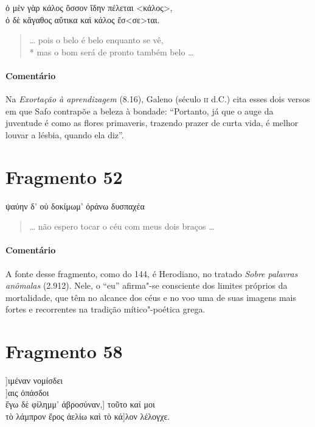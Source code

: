 \begin{gkverse}
ὀ μὲν γὰρ κάλος ὄσσον ἴδην πέλεται <κάλος>,\\
ὀ δὲ κἄγαθος αὔτικα καὶ κάλος ἔσ<σε>ται.
\end{gkverse}

\begin{verse}
\ldots{} pois o belo é belo enquanto se vê,\\*
mas o bom será de pronto também belo \ldots{}
\end{verse}

{\paragraph{Comentário} Na \textit{Exortação à aprendizagem} (8.16), Galeno (século \textsc{ii} d.C.) cita esses dois versos
em que Safo contrapõe a beleza à bondade: ``Portanto, já que o auge da
juventude é como as flores primaveris, trazendo prazer de curta vida, é melhor
louvar a lésbia, quando ela diz''.}

\pagebreak
\section{Fragmento 52}

\begin{gkverse}
ψαύην δ’ οὐ δοκίμωμ’ ὀράνω \dagger{}δυσπαχέα\dagger{}
\end{gkverse}

\begin{verse}
\ldots{} não espero tocar o céu com meus dois braços \ldots{}
\end{verse}

{\paragraph{Comentário} A fonte desse fragmento, como do 144, é Herodiano, no tratado \textit{Sobre
palavras anômalas} (2.912). Nele, o “eu” afirma"-se consciente dos limites próprios da
mortalidade, que têm no alcance dos céus e no voo uma de suas imagens mais
fortes e recorrentes na tradição mítico"-poética grega.}


\section{Fragmento 58}

\begin{gkverse}
]ιμέναν νομίσδει\\
    ]αις ὀπάσδοι\\
ἔγω δὲ φίλημμ’ ἀβροσύναν,\qquad       ] τοῦτο καί μοι\\
τὸ λάμπρον ἔρος ἀελίω καὶ τὸ κά]λον λέλογχε.
\end{gkverse}

